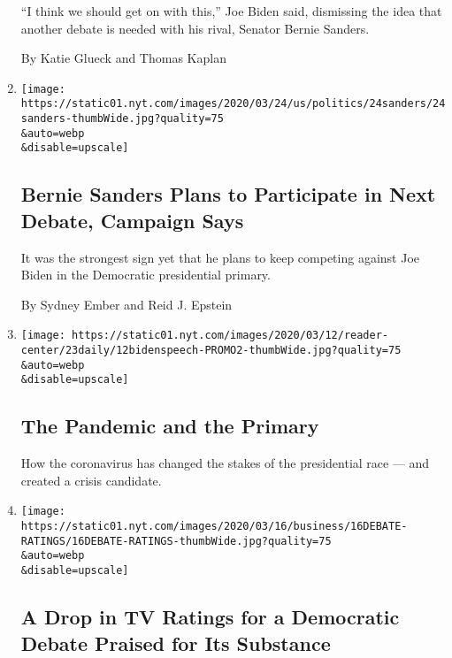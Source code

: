 \begin{enumerate}
  ``I think we should get on with this,'' Joe Biden said, dismissing the
  idea that another debate is needed with his rival, Senator Bernie
  Sanders.

  By Katie Glueck and Thomas Kaplan
\item
  \href{/2020/03/24/us/politics/biden-sanders-next-democratic-debate.html}{}

  \texttt{[image: https://static01.nyt.com/images/2020/03/24/us/politics/24sanders/24sanders-thumbWide.jpg?quality=75\\\&auto=webp\\\&disable=upscale]}

  \hypertarget{bernie-sanders-plans-to-participate-in-next-debate-campaign-says}{%
  \subsection{Bernie Sanders Plans to Participate in Next Debate,
  Campaign
  Says}\label{bernie-sanders-plans-to-participate-in-next-debate-campaign-says}}

  It was the strongest sign yet that he plans to keep competing against
  Joe Biden in the Democratic presidential primary.

  By Sydney Ember and Reid J. Epstein
\item
  \href{/2020/03/23/podcasts/the-daily/democratic-primary-coronavirus.html}{}

  \texttt{[image: https://static01.nyt.com/images/2020/03/12/reader-center/23daily/12bidenspeech-PROMO2-thumbWide.jpg?quality=75\\\&auto=webp\\\&disable=upscale]}

  \hypertarget{the-pandemic-and-the-primary}{%
  \subsection{The Pandemic and the
  Primary}\label{the-pandemic-and-the-primary}}

  How the coronavirus has changed the stakes of the presidential race
  --- and created a crisis candidate.
\item
  \href{/2020/03/16/business/media/cnn-debate-ratings-coronavirus.html}{}

  \texttt{[image: https://static01.nyt.com/images/2020/03/16/business/16DEBATE-RATINGS/16DEBATE-RATINGS-thumbWide.jpg?quality=75\\\&auto=webp\\\&disable=upscale]}

  \hypertarget{a-drop-in-tv-ratings-for-a-democratic-debate-praised-for-its-substance}{%
  \subsection{A Drop in TV Ratings for a Democratic Debate Praised for
  Its
  Substance}\label{a-drop-in-tv-ratings-for-a-democratic-debate-praised-for-its-substance}}


\end{enumerate}
